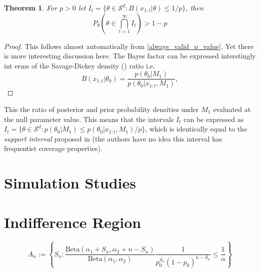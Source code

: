 \documentclass[11pt]{article}
\newcommand{\Beta}{\mathrm{Beta}}
\newtheorem{thm}{Theorem}[section]
\begin{document}
\begin{thm}
  For $p>0$ let $I_t = \lbrace \theta \in \mathcal{S}^d : B(x_{1:t}|\theta) \leq 1/p \rbrace $, then
  \begin{equation}
    \label{eq:always_valid_ci}
    P_{\theta}\left(\theta \in \bigcap_{t=1}^{\infty} I_t\right) > 1-p
  \end{equation}
\end{thm}
\begin{proof}
  This follows almost automatically from \ref{always_valid_p_value}. Yet there is more interesting discussion here. The Bayes factor can be expressed interstingly int erms of the Savage-Dickey density (\cite{dickey}) ratio i.e.
  \begin{equation}
    B(x_{1:t}|\theta_0) = \frac{p(\theta_0| M_1)}{p(\theta_0|x_{1:t},M_1)},
  \end{equation}
\end{proof}
This the ratio of posterior and prior probability densities under $M_1$ evaluated at the null parameter value. This means that the intervals $I_t$ can be expressed as
$I_t = \lbrace \theta \in \mathcal{S}^d : p(\theta_0| M_1)\leq p(\theta_0|x_{1:t}, M_1)/p \rbrace $, which is identically equal to the \textit{support interval} proposed in \cite{support_interval} (the authors have no idea this interval has frequentist coverage properties).

\section{Simulation Studies}
\label{sec:simulation}
\section{Indifference Region}

\begin{equation}
  A_n := \left\{ S_n : \frac{\Beta(\alpha_1 + S_n, \alpha_2 + n - S_n)}{\Beta(\alpha_1, \alpha_2)} \frac{1}{p_0^{S_n}(1-p_0)^{n-S_n}} \leq \frac{1}{\alpha} \right\}
\end{equation}
\end{document}

